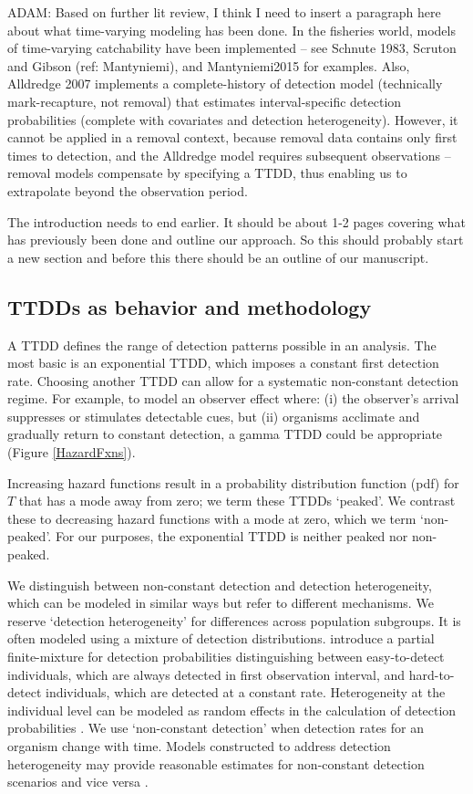 \documentclass[useAMS,usenatbib,referee,12pt]{article}
\newcommand{\adam}[1]{{\color{blue} ADAM: #1}}
\newcommand{\jarad}[1]{{\color{red} #1}}
\begin{document}
\adam{Based on further lit review, I think I need to insert a paragraph here about what time-varying modeling has been done.  In the fisheries world, models of time-varying catchability have been implemented -- see Schnute 1983, Scruton and Gibson (ref: Mantyniemi), and Mantyniemi2015 for examples.  Also, Alldredge 2007 implements a complete-history of detection model (technically mark-recapture, not removal) that estimates interval-specific detection probabilities (complete with covariates and detection heterogeneity).  However, it cannot be applied in a removal context, because removal data contains only first times to detection, and the Alldredge model requires subsequent observations -- removal models compensate by specifying a TTDD, thus enabling us to extrapolate beyond the observation period.}  

\jarad{The introduction needs to end earlier. It should be about 1-2 pages covering what has previously been done and outline our approach. So this should probably start a new section and before this there should be an outline of our manuscript. }

\subsection{TTDDs as behavior and methodology}

A TTDD defines the range of detection patterns possible in an analysis.  The most basic is an exponential TTDD, which imposes a constant first detection rate.  Choosing another TTDD can allow for a systematic non-constant detection regime.  For example, to model an observer effect where: (i) the observer's arrival suppresses or stimulates detectable cues, but (ii) organisms acclimate and gradually return to constant detection, a gamma TTDD could be appropriate (Figure \ref{HazardFxns}).

Increasing hazard functions result in a probability distribution function (pdf) for $T$ that has a mode away from zero; we term these TTDDs `peaked'.  We contrast these to decreasing hazard functions with a mode at zero, which we term `non-peaked'.  For our purposes, the exponential TTDD is neither peaked nor non-peaked.

We distinguish between non-constant detection and detection heterogeneity, which can be modeled in similar ways but refer to different mechanisms.  We reserve `detection heterogeneity' for differences across population subgroups.  It is often modeled using a mixture of detection distributions.  \citet{Farnsworth2002} introduce a partial finite-mixture for detection probabilities distinguishing between easy-to-detect individuals, which are always detected in first observation interval, and hard-to-detect individuals, which are detected at a constant rate.   Heterogeneity at the individual level can be modeled as random effects in the calculation of detection probabilities \citep{DorazioRoyle2003, Mantyniemi2005}.  We use `non-constant detection' when detection rates for an organism change with time.  Models constructed to address detection heterogeneity may provide reasonable estimates for non-constant detection scenarios and vice versa \citep{Mantyniemi2005}.
\end{document}
